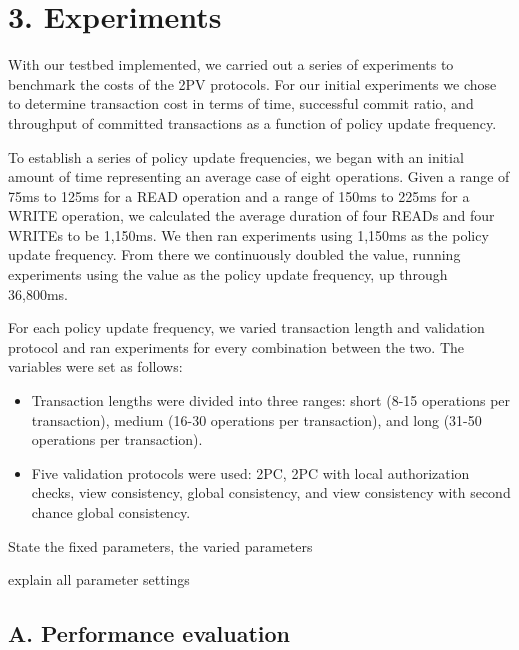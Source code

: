 \documentclass[11pt]{article}
\begin{document}
\section{3. Experiments}
With our testbed implemented, we carried out a series of experiments to benchmark the costs of the 2PV protocols. For our initial experiments we chose to determine transaction cost in terms of time, successful commit ratio, and throughput of committed transactions as a function of policy update frequency.

To establish a series of policy update frequencies, we began with an initial amount of time representing an average case of eight operations. Given a range of 75ms to 125ms for a READ operation and a range of 150ms to 225ms for a WRITE operation, we calculated the average duration of four READs and four WRITEs to be 1,150ms. We then ran experiments using 1,150ms as the policy update frequency. From there we continuously doubled the value, running experiments using the value as the policy update frequency, up through 36,800ms.

For each policy update frequency, we varied transaction length and validation protocol and ran experiments for every combination between the two. The variables were set as follows:
\begin{itemize}
\item{}Transaction lengths were divided into three ranges: short (8-15 operations per transaction), medium (16-30 operations per transaction), and long (31-50 operations per transaction).
\item{}Five validation protocols were used: 2PC, 2PC with local authorization checks, view consistency, global consistency, and view consistency with second chance global consistency.
\end{itemize}

State the fixed parameters, the varied parameters

explain all parameter settings

\subsection{A. Performance evaluation}
\end{document}
